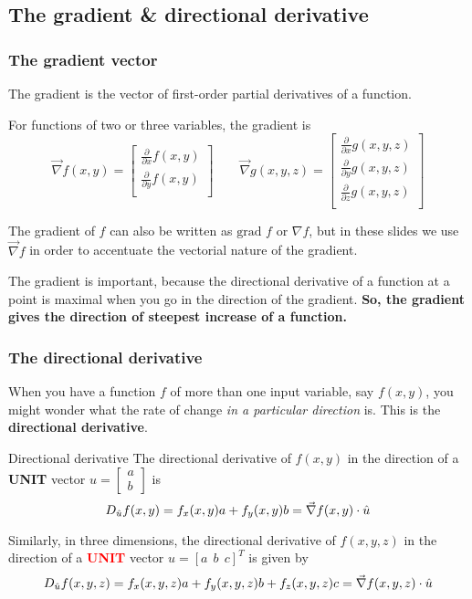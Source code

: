     \subsection{The gradient \& directional derivative}
\begin{frame}
\frametitle{The gradient vector}

The gradient is the vector of first-order partial derivatives of a function.

For functions of two or three variables, the gradient is
\[\vec{\nabla} f(x,y) =
\begin{bmatrix}
\frac{\partial}{\partial x} f(x,y)\\
\frac{\partial}{\partial y} f(x,y)\\
\end{bmatrix}
\qquad
\vec{\nabla} g(x,y,z) =
\begin{bmatrix}
\frac{\partial}{\partial x} g(x,y,z)\\
\frac{\partial}{\partial y} g(x,y,z)\\
\frac{\partial}{\partial z} g(x,y,z)\\
\end{bmatrix}
\]


The gradient of $f$ can also be written as $\text{grad } f$ or $\nabla f$, but in these slides we use $\vec{\nabla} f$ in order to accentuate the vectorial nature of the gradient.

The gradient is important, because the directional derivative of a function at a point is maximal when you go in the direction of the gradient. \textbf{So, the gradient gives the direction of steepest increase of a function.}

\end{frame}


\begin{frame}
\frametitle{The directional derivative}

When you have a function $f$ of more than one input variable, say $f(x,y)$, you might wonder what the rate of change \textit{in a particular direction} is. This is the \textbf{directional derivative}.
    \begin{theorybox}{Directional derivative}
    The directional derivative of $f(x,y)$ in the direction of a \textbf{UNIT} vector $\hat{u}=\begin{bmatrix}a\\b\end{bmatrix}$ is
    \[D_{\hat{u}}f(x,y)=f_x(x,y)a+f_y(x,y)b=\vec{\nabla} f(x,y)\cdot\hat{u}\]

    Similarly, in three dimensions, the directional derivative of $f(x,y,z)$ in the direction of a \textbf{\textcolor{red}{UNIT}} vector $\hat{u}=[a~~b~~c]^T$ is given by
    \[D_{\hat{u}}f(x,y,z)=f_x(x,y,z)a+f_y(x,y,z)b+f_z(x,y,z)c=\vec{\nabla} f(x,y,z)\cdot\hat{u}\]
    
\end{theorybox}
\end{frame}

